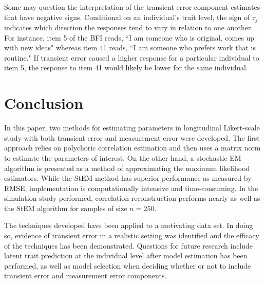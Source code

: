 \documentclass[12pt]{article}
\begin{document}
Some may question the interpretation of the transient error component estimates that have negative signs. Conditional on an individual's trait level, the sign of $\tau_j$ indicates which direction the responses tend to vary in relation to one another. For instance, item 5 of the BFI reads, ``I am someone who is original, comes up with new ideas" whereas item 41 reads, ``I am someone who prefers work that is routine." If transient error caused a higher response for a particular individual to item 5, the response to item 41 would likely be lower for the same individual.

\section{Conclusion}

In this paper, two methods for estimating parameters in longitudinal Likert-scale study with both transient error and measurement error were developed. The first approach relies on polychoric correlation estimation and then uses a matrix norm to estimate the parameters of interest. On the other hand, a stochastic EM algorithm is presented as a method of approximating the maximum likelihood estimators. While the StEM method has superior performance as measured by RMSE, implementation is computationally intensive and time-consuming. In the simulation study performed, correlation reconstruction performs nearly as well as the StEM algorithm for samples of size $n=250$. 

The techniques developed have been applied to a motivating data set. In doing
so, evidence of transient error in a realistic setting was identified and
the efficacy of the techniques has been demonstrated. Questions for future research include latent trait prediction at the individual level after model estimation has been performed, as well as model selection when deciding whether or not to include transient error and measurement error components.

\vspace{\fill}\pagebreak

\end{document}
